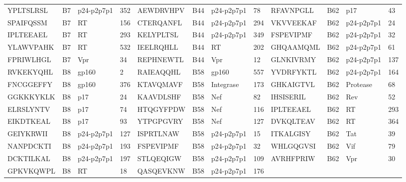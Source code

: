 \begin{table}[htp]
\begin{center}
\begin{sideways}
{\begin{tabulary}{1.5\textwidth}{|l|l|l|l|l|l|l|l|l|l|l|l|}
YPLTSLRSL & B7 & p24-p2p7p1 & 352 & AEWDRVHPV & B44 & p24-p2p7p1 & 78 & RFAVNPGLL & B62 & p17 & 43 \\
SPAIFQSSM & B7 & RT & 156 & CTERQANFL & B44 & p24-p2p7p1 & 294 & VKVVEEKAF & B62 & p24-p2p7p1 & 24 \\
IPLTEEAEL & B7 & RT & 293 & KELYPLTSL & B44 & p24-p2p7p1 & 349 & FSPEVIPMF & B62 & p24-p2p7p1 & 32 \\
YLAWVPAHK & B7 & RT & 532 & IEELRQHLL & B44 & RT & 202 & GHQAAMQML & B62 & p24-p2p7p1 & 61 \\
FPRIWLHGL & B7 & Vpr & 34 & REPHNEWTL & B44 & Vpr & 12 & GLNKIVRMY & B62 & p24-p2p7p1 & 137 \\
RVKEKYQHL & B8 & gp160 & 2 & RAIEAQQHL & B58 & gp160 & 557 & YVDRFYKTL & B62 & p24-p2p7p1 & 164 \\
FNCGGEFFY & B8 & gp160 & 376 & KTAVQMAVF & B58 & Integrase & 173 & GHKAIGTVL & B62 & Protease & 68 \\
GGKKKYKLK & B8 & p17 & 24 & KAAVDLSHF & B58 & Nef & 82 & IHSISERIL & B62 & Rev & 52 \\
ELRSLYNTV & B8 & p17 & 74 & HTQGYFPDW & B58 & Nef & 116 & IPLTEEAEL & B62 & RT & 293 \\
EIKDTKEAL & B8 & p17 & 93 & YTPGPGVRY & B58 & Nef & 127 & DVKQLTEAV & B62 & RT & 364 \\
GEIYKRWII & B8 & p24-p2p7p1 & 127 & ISPRTLNAW & B58 & p24-p2p7p1 & 15 & ITKALGISY & B62 & Tat & 39 \\
NANPDCKTI & B8 & p24-p2p7p1 & 193 & FSPEVIPMF & B58 & p24-p2p7p1 & 32 & WHLGQGVSI & B62 & Vif & 79 \\
DCKTILKAL & B8 & p24-p2p7p1 & 197 & STLQEQIGW & B58 & p24-p2p7p1 & 109 & AVRHFPRIW & B62 & Vpr & 30 \\
GPKVKQWPL & B8 & RT & 18 & QASQEVKNW & B58 & p24-p2p7p1 & 176 & & & & \bigstrut[b] \\		
\hline
\end{tabulary}
}
\end{sideways}
\end{center}
\end{table}

